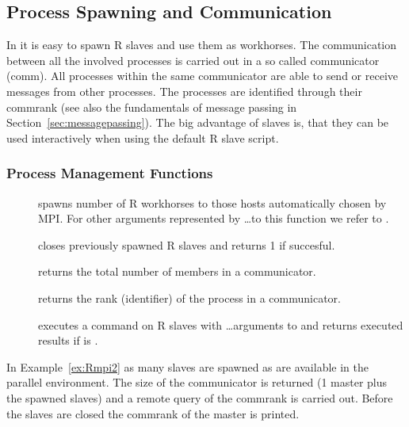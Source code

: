 \subsection{Process Spawning and Communication}

In  it is easy to spawn R slaves and use them as
workhorses. The 
communication between all the involved processes is carried out in a
so called communicator (comm). All processes within the same
communicator are able to send or receive messages from other
processes. The processes are identified through their commrank (see
also the fundamentals of message passing in
Section~\ref{sec:messagepassing}). The big advantage of 
slaves is, that they can be used interactively when using the default
R slave script.

\subsubsection{Process Management  Functions}
\begin{description}
\item[] spawns  number of R
  workhorses to those hosts automatically chosen by MPI. For other
  arguments represented by \ldots to this function we refer to
  \cite{yu06Rmpi}.
\item[] closes
  previously spawned R slaves and returns 1 if succesful.
\item[] returns the total number of members in
  a communicator.
\item[] returns the rank (identifier) of the
  process in a communicator.
\item[]
  executes a command  on R slaves with \ldots arguments to
   and returns executed results if  is
  .
\end{description}

In Example~\ref{ex:Rmpi2} as many slaves are spawned as are available
in the parallel environment. The size of the communicator is returned
(1 master plus the spawned slaves) and a remote query of the commrank
is carried out. Before the slaves are closed the commrank of the
master is printed.

